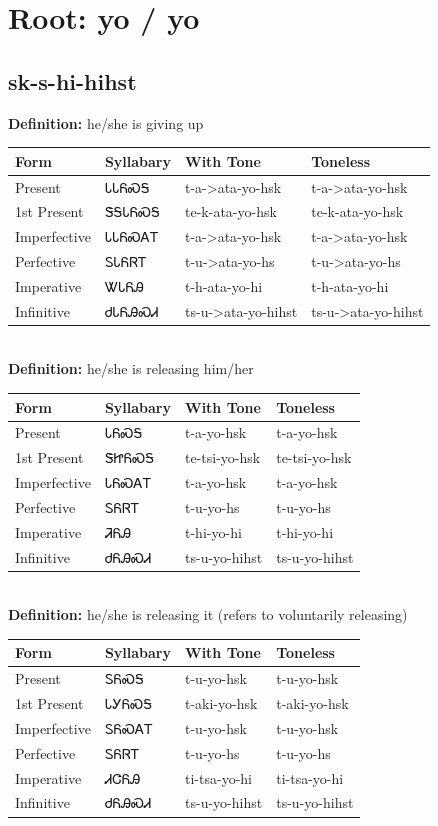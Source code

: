 \documentclass{article}%
\begin{document}
%
\normalsize%
\section*{Root: yo / yo}%
\subsection*{sk-s-hi-hihst}%
\textbf{Definition: }%
he/she is giving up%
\\[0.5em]%
\begin{tabular}{|l|l|l|l|}%
\hline%
\textbf{Form}&\textbf{Syllabary}&\textbf{With Tone}&\textbf{Toneless}\\%
\hline%
Present&ᏓᏓᏲᏍᎦ&t{-}a{-}>ata{-}yo{-}hsk&t{-}a{-}>ata{-}yo{-}hsk\\%
1st Present&ᏕᎦᏓᏲᏍᎦ&te{-}k{-}ata{-}yo{-}hsk&te{-}k{-}ata{-}yo{-}hsk\\%
Imperfective&ᏓᏓᏲᏍᎪᎢ&t{-}a{-}>ata{-}yo{-}hsk&t{-}a{-}>ata{-}yo{-}hsk\\%
Perfective&ᏚᏓᏲᏒᎢ&t{-}u{-}>ata{-}yo{-}hs&t{-}u{-}>ata{-}yo{-}hs\\%
Imperative&ᏔᏓᏲᎯ&t{-}h{-}ata{-}yo{-}hi&t{-}h{-}ata{-}yo{-}hi\\%
Infinitive&ᏧᏓᏲᎯᏍᏗ&ts{-}u{-}>ata{-}yo{-}hihst&ts{-}u{-}>ata{-}yo{-}hihst\\%
\hline%
\end{tabular}%
\\[1em]%
\textbf{Definition: }%
he/she is releasing him/her%
\\[0.5em]%
\begin{tabular}{|l|l|l|l|}%
\hline%
\textbf{Form}&\textbf{Syllabary}&\textbf{With Tone}&\textbf{Toneless}\\%
\hline%
Present&ᏓᏲᏍᎦ&t{-}a{-}yo{-}hsk&t{-}a{-}yo{-}hsk\\%
1st Present&ᏕᏥᏲᏍᎦ&te{-}tsi{-}yo{-}hsk&te{-}tsi{-}yo{-}hsk\\%
Imperfective&ᏓᏲᏍᎪᎢ&t{-}a{-}yo{-}hsk&t{-}a{-}yo{-}hsk\\%
Perfective&ᏚᏲᏒᎢ&t{-}u{-}yo{-}hs&t{-}u{-}yo{-}hs\\%
Imperative&ᏘᏲᎯ&t{-}hi{-}yo{-}hi&t{-}hi{-}yo{-}hi\\%
Infinitive&ᏧᏲᎯᏍᏗ&ts{-}u{-}yo{-}hihst&ts{-}u{-}yo{-}hihst\\%
\hline%
\end{tabular}%
\\[1em]%
\textbf{Definition: }%
he/she is releasing it (refers to voluntarily releasing)%
\\[0.5em]%
\begin{tabular}{|l|l|l|l|}%
\hline%
\textbf{Form}&\textbf{Syllabary}&\textbf{With Tone}&\textbf{Toneless}\\%
\hline%
Present&ᏚᏲᏍᎦ&t{-}u{-}yo{-}hsk&t{-}u{-}yo{-}hsk\\%
1st Present&ᏓᎩᏲᏍᎦ&t{-}aki{-}yo{-}hsk&t{-}aki{-}yo{-}hsk\\%
Imperfective&ᏚᏲᏍᎪᎢ&t{-}u{-}yo{-}hsk&t{-}u{-}yo{-}hsk\\%
Perfective&ᏚᏲᏒᎢ&t{-}u{-}yo{-}hs&t{-}u{-}yo{-}hs\\%
Imperative&ᏗᏣᏲᎯ&ti{-}tsa{-}yo{-}hi&ti{-}tsa{-}yo{-}hi\\%
Infinitive&ᏧᏲᎯᏍᏗ&ts{-}u{-}yo{-}hihst&ts{-}u{-}yo{-}hihst\\%
\hline%
\end{tabular}%
\\[1em]%
\end{document}
